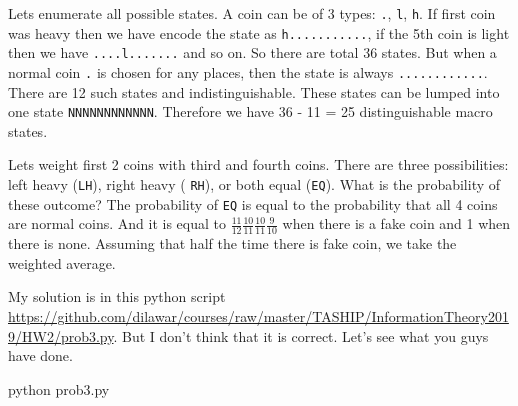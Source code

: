 \documentclass[answers]{exam}
\begin{document}
\begin{questions}
\begin{solution}

Lets enumerate all possible states. A coin can be of 3 types: \texttt{.},
\texttt{l}, \texttt{h}. If first coin was heavy then we have encode the state as
\texttt{h...........}, if the 5th coin is light then we have
\texttt{....l.......} and so on. So there are total 36 states. But when a normal
coin \texttt{.} is chosen for any places, then the state is always
\texttt{............}. There are 12 such states and indistinguishable. These
states can be lumped into one state \texttt{NNNNNNNNNNNN}. Therefore we have 36
- 11 = 25 distinguishable macro states.

Lets weight first 2 coins with third and fourth coins.  There are three
possibilities: left heavy (\texttt{LH}), right heavy ( \texttt{RH}), or both
equal (\texttt{EQ}). What is the probability of these outcome? The probability
of \texttt{EQ} is equal to the probability that all 4 coins are normal coins.
And it is equal to $\frac{11}{12}\frac{10}{11}\frac{10}{11}\frac{9}{10}$ when
there is a fake coin and 1 when there is none. Assuming that half the time there
is fake coin, we take the weighted average.

My solution is in this python script
\url{https://github.com/dilawar/courses/raw/master/TASHIP/InformationTheory2019/HW2/prob3.py}.
But I don't think that it is correct. Let's see what you guys have done.

\bash[stdout]
python prob3.py
\END

\end{solution}


\end{questions}
\end{document}
